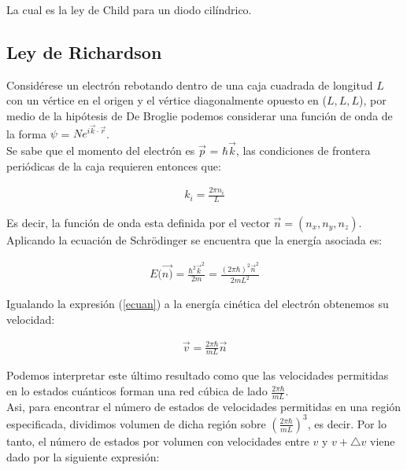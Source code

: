 \documentclass[%
 reprint,
 amsmath,amssymb,
 aps,
]{revtex4-2}
\begin{document}
\vspace{0.2 cm}
La cual es la ley de Child para un diodo cilíndrico.

\subsection{Ley de Richardson}

Considérese un electrón rebotando dentro de una caja cuadrada de longitud $L$ con un vértice en el origen y el vértice diagonalmente opuesto en ($L,L,L$), por medio de la hipótesis de De Broglie podemos considerar una función de onda de la forma $\psi$ = $Ne^{i\Vec{k}\cdot\Vec{r}}$.
\\

Se sabe que el momento del electrón es $\Vec{p}$ = $\hbar\Vec{k}$, las condiciones de frontera periódicas de la caja requieren entonces que:

\begin{align*}
    k_i = \frac{2\pi n_i}{L}
\end{align*}

\vspace{0.2 cm}
Es decir, la función de onda esta definida por el vector $\vec{n}= (n_{x},n_{y},n_{z})$. Aplicando la ecuación de Schr\"odinger se encuentra que la energía asociada es:

\begin{align}
    \label{ecuan}
    E(\Vec{n)} = \frac{\hbar^{2}\vec{k}^{2}}{2m}= \frac{(2\pi\hbar)^{2}\vec{n}^{2}}{2mL^{2}}
\end{align}

\vspace{0.2 cm}
Igualando la expresión (\ref{ecuan}) a la energía cinética del electrón obtenemos su velocidad:

\begin{align*}
    \vec{v}= \frac{2\pi\hbar}{mL}\vec{n}
\end{align*}

\vspace{0.2 cm}
Podemos interpretar este último resultado como que las velocidades permitidas en lo estados cuánticos forman una red cúbica de lado $\frac{2\pi\hbar}{mL}$.
\\

Asi, para encontrar el número de estados de velocidades permitidas en una región especificada, dividimos volumen de dicha región sobre $(\frac{2\pi\hbar}{mL})^{3}$, es decir. Por lo tanto, el número de estados por volumen con velocidades entre $v$ y $v + \triangle v$ viene dado por la siguiente expresión:
\end{document}
